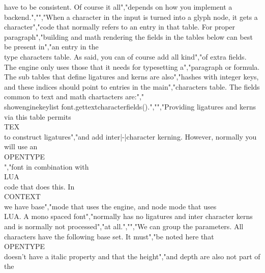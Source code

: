 have to be consistent. Of course it all","depends on how you implement a backend.","","When a character in the input is turned into a glyph node, it gets a character","code that normally refers to an entry in that table. For proper paragraph","building and math rendering the fields in the tables below can best be present in","an entry in the \\type {characters} table. As said, you can of course add all kind","of extra fields. The engine only uses those that it needs for typesetting a","paragraph or formula. The sub tables that define ligatures and kerns are also","hashes with integer keys, and these indices should point to entries in the main","characters table. The fields common to text and math chartacters are:","\\showenginekeylist {font.gettextcharacterfields()}.","","Providing ligatures and kerns via this table permits \\TEX\\ to construct ligatures","and add inter|-|character kerning. However, normally you will use an \\OPENTYPE\\","font in combination with \\LUA\\ code that does this. In \\CONTEXT\\ we have base","mode that uses the engine, and node mode that uses \\LUA. A mono spaced font","normally has no ligatures and inter character kerns and is normally not processed","at all.","","We can group the parameters. All characters have the following base set. It must","be noted here that \\OPENTYPE\\ doesn't have a italic property and that the height","and depth are also not part of the 